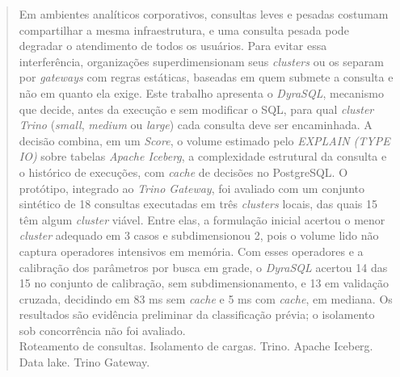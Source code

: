\begin{abstract}
    \noindent
    Em ambientes analíticos corporativos, consultas leves e pesadas costumam compartilhar a mesma infraestrutura, e uma consulta pesada pode degradar o atendimento de todos os usuários. Para evitar essa interferência, organizações superdimensionam seus \textit{clusters} ou os separam por \textit{gateways} com regras estáticas, baseadas em quem submete a consulta e não em quanto ela exige. Este trabalho apresenta o \textit{DyraSQL}, mecanismo que decide, antes da execução e sem modificar o SQL, para qual \textit{cluster} \textit{Trino} (\textit{small}, \textit{medium} ou \textit{large}) cada consulta deve ser encaminhada. A decisão combina, em um \textit{Score}, o volume estimado pelo \textit{EXPLAIN (TYPE IO)} sobre tabelas \textit{Apache Iceberg}, a complexidade estrutural da consulta e o histórico de execuções, com \textit{cache} de decisões no PostgreSQL. O protótipo, integrado ao \textit{Trino Gateway}, foi avaliado com um conjunto sintético de 18 consultas executadas em três \textit{clusters} locais, das quais 15 têm algum \textit{cluster} viável. Entre elas, a formulação inicial acertou o menor \textit{cluster} adequado em 3 casos e subdimensionou 2, pois o volume lido não captura operadores intensivos em memória. Com esses operadores e a calibração dos parâmetros por busca em grade, o \textit{DyraSQL} acertou 14 das 15 no conjunto de calibração, sem subdimensionamento, e 13 em validação cruzada, decidindo em 83 ms sem \textit{cache} e 5 ms com \textit{cache}, em mediana. Os resultados são evidência preliminar da classificação prévia; o isolamento sob concorrência não foi avaliado.
    \\\textbf{} Roteamento de consultas. Isolamento de cargas. Trino. Apache Iceberg. Data lake. Trino Gateway.
    \end{abstract}
